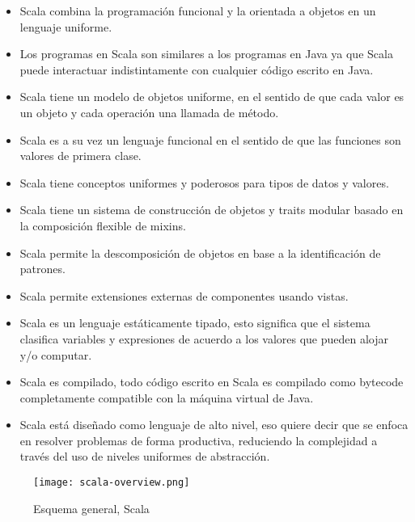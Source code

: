   \begin{itemize}
   \item Scala combina la programaci\'on funcional y la orientada a
     objetos en un lenguaje uniforme.

   \item Los programas en Scala son similares a los programas en Java
     ya que Scala puede interactuar indistintamente con cualquier
     c\'odigo escrito en Java.

   \item Scala tiene un modelo de objetos uniforme, en el sentido de
     que cada valor es un objeto y cada operaci\'on una llamada de
     m\'etodo.

   \item Scala es a su vez un lenguaje funcional en el sentido de que
     las funciones son valores de primera clase.

   \item Scala tiene conceptos uniformes y poderosos para tipos de
     datos y valores.

   \item Scala tiene un sistema de construcci\'on de objetos y traits
     modular basado en la composici\'on flexible de mixins.

   \item Scala permite la descomposici\'on de objetos en base a la
     identificaci\'on de patrones.

   \item Scala permite extensiones externas de componentes usando
     vistas.

   \item Scala es un lenguaje est\'aticamente tipado, esto significa
     que el sistema clasifica variables y expresiones de acuerdo a los
     valores que pueden alojar y/o computar.

   \item Scala es compilado, todo c\'odigo escrito en Scala es
     compilado como bytecode completamente compatible con la m\'aquina
     virtual de Java.

   \item Scala est\'a dise\~nado como lenguaje de alto nivel, eso
     quiere decir que se enfoca en resolver problemas de forma
     productiva, reduciendo la complejidad a trav\'es del uso de
     niveles uniformes de abstracci\'on.

  \end{itemize}

  \begin{figure}[!hbtp]
    \centerline{\texttt{[image: scala-overview.png]}}
    \caption{Esquema general, Scala \citep{scalaIntro} }
  \end{figure}


